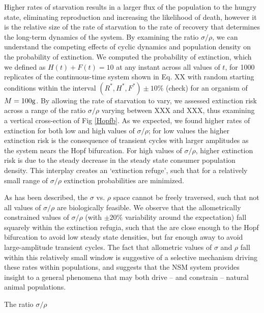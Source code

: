 \documentclass[12pt,english]{article}
\begin{document}
\begin{spacing}{1.9}
Higher rates of starvation results in a larger flux of the population to the hungry state, eliminating reproduction and increasing the likelihood of death, however it is the relative size of the rate of starvation to the rate of recovery that determines the long-term dynamics of the system.
By examining the ratio $\sigma/\rho$, we can understand the competing effects of cyclic dynamics and population density on the probability of extinction.
We computed the probability of extinction, which we defined as $H(t)+F(t)=10$ at any instant across all values of $t$, for 1000 replicates of the continuous-time system shown in Eq. XX with random starting conditions within the interval $(R^*,H^*,F^*)\pm10\%$ (check) for an organism of $M=100{\rm g}$.
By allowing the rate of starvation to vary, we assessed extinction risk across a range of the ratio $\sigma/\rho$ varying between XXX and XXX, thus examining a vertical cross-ection of Fig \ref{Hopfb}.
As we expected, we found higher rates of extinction for both low and high values of $\sigma/\rho$; for low values the higher extinction risk is the consequence of transient cycles with larger amplitudes as the system nears the Hopf bifurcation.
For high values of $\sigma/\rho$, higher extinction risk is due to the steady decrease in the steady state consumer population density.
This interplay creates an `extinction refuge', such that for a relatively small range of $\sigma/\rho$ extinction probabilities are minimized.

As has been described, the $\sigma$ vs. $\rho$ space cannot be freely traversed, such that not all values of $\sigma/\rho$ are biologically feasible.
We observe that the allometrically constrained values of $\sigma/\rho$ (with $\pm 20\%$ variability around the expectation) fall squarely within the extinction refugia, such that the are close enough to the Hopf bifurcation to avoid low steady state densities, but far enough away to avoid large-amplitude transient cycles.
The fact that allometric values of $\sigma$ and $\rho$ fall within this relatively small window is suggestive of a selective mechanism driving these rates within populations, and suggests that the NSM system provides insight to a general phenomena that may both drive -- and constrain -- natural animal populations.





The ratio $\sigma/\rho$  




\end{spacing}
\end{document}
